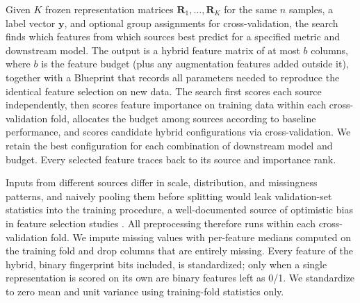 Given $K$ frozen representation matrices $\mathbf{R}_1, \dots, \mathbf{R}_K$ for the same $n$ samples, a label vector $\mathbf{y}$, and optional group assignments for cross-validation, the search finds which features from which sources best predict for a specified metric and downstream model. The output is a hybrid feature matrix of at most $b$ columns, where $b$ is the feature budget (plus any augmentation features added outside it), together with a Blueprint that records all parameters needed to reproduce the identical feature selection on new data. The search first scores each source independently, then scores feature importance on training data within each cross-validation fold, allocates the budget among sources according to baseline performance, and scores candidate hybrid configurations via cross-validation. We retain the best configuration for each combination of downstream model and budget. Every selected feature traces back to its source and importance rank.

Inputs from different sources differ in scale, distribution, and missingness patterns, and naively pooling them before splitting would leak validation-set statistics into the training procedure, a well-documented source of optimistic bias in feature selection studies \citep{Ambroise2002, Vabalas2019}. All preprocessing therefore runs within each cross-validation fold. We impute missing values with per-feature medians computed on the training fold and drop columns that are entirely missing. Every feature of the hybrid, binary fingerprint bits included, is standardized; only when a single representation is scored on its own are binary features left as 0/1. We standardize to zero mean and unit variance using training-fold statistics only.



